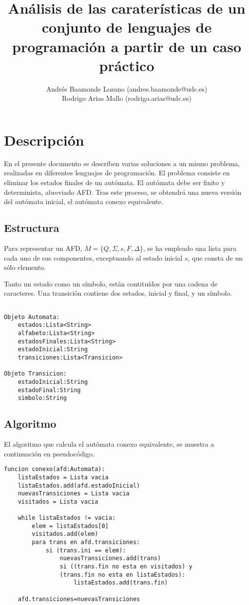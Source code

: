 \documentclass[12pt,a4paper]{article}
\title{Análisis de las caraterísticas de un conjunto de lenguajes de
programación a partir de un caso práctico}
\author{Andrés Baamonde Lozano (andres.baamonde@udc.es)\\
	Rodrigo Arias Mallo (rodrigo.arias@udc.es)}
\begin{document}
\maketitle


\section{Descripción}

En el presente documento se describen varias soluciones a un mismo problema,
realizadas en diferentes lenguajes de programación. El problema consiste en
eliminar los estados finales de un autómata. El autómata debe ser finito y
determinista, abreviado AFD. Tras este proceso, se obtendrá una nueva versión
del autómata inicial, el autómata conexo equivalente.  

\subsection{Estructura}

Para representar un AFD, $M = \{ Q, \Sigma, s, F, \Delta \} $, se ha empleado una 
lista para cada uno de sus componentes, exceptuando al estado inicial $s$, que 
consta de un sólo elemento.

Tanto un estado como un símbolo, están contituídos por una cadena de caracteres.  
Una transición contiene dos estados, inicial y final, y un símbolo.

\begin{lstlisting}

Objeto Automata:
	estados:Lista<String>
	alfabeto:Lista<String>
	estadosFinales:Lista<String>
	estadoInicial:String
	transiciones:Lista<Transicion>

Objeto Transicion:
	estadoInicial:String
	estadoFinal:String
	simbolo:String

\end{lstlisting}

\subsection{Algoritmo}
El algoritmo que calcula el autómata conexo equivalente, se muestra a 
continuación en pseudocódigo.

\begin{lstlisting}
funcion conexo(afd:Automata):
	listaEstados = Lista vacia
	listaEstados.add(afd.estadoInicial)
	nuevasTransiciones = Lista vacia
	visitados = Lista vacia

	while listaEstados != vacia:
		elem = listaEstados[0]
		visitados.add(elem)
		para trans en afd.transiciones:
			si (trans.ini == elem):
				nuevasTransiciones.add(trans)
				si ((trans.fin no esta en visitados) y
				(trans.fin no esta en listaEstados):
					listaEstados.add(trans.fin)
					
	afd.transiciones=nuevasTransiciones

\end{lstlisting}
\end{document}
